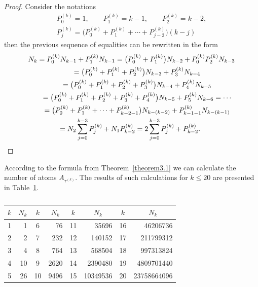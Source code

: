 \documentclass[pdftex]{sigma}
\numberwithin{equation}{section}
\begin{document}
\begin{proof}
Consider the notations
\begin{gather*}
P_{0}^{(k)}=1, \qquad P_{1}^{(k)}=k-1, \qquad P_{2}^{(k)}=k-2,\\
P_{j}^{(k)}=\big(P_{0}^{(k)}+P_{1}^{(k)}+\cdots+P_{j-2}^{(k)}\big)(k-j)
\end{gather*} then the previous sequence of equalities can be rewritten in the form
\begin{gather*}
N_{k}= P_{0}^{(k)} N_{k-1}+P_{1}^{(k)} N_{k-1} = \big(P_{0}^{(k)}+P_{1}^{(k)}\big) N_{k-2}+P_{0}^{(k)}P_{2}^{(k)} N_{k-3}\\
\hphantom{N_{k}}{} = \big(P_{0}^{(k)}+P_{1}^{(k)}+P_{2}^{(k)}\big) N_{k-3}+P_{3}^{(k)} N_{k-4}\\
\hphantom{N_{k}}{} = \big(P_{0}^{(k)}+P_{1}^{(k)}+P_{2}^{(k)}+P_{3}^{(k)}\big) N_{k-4}+P_{4}^{(k)} N_{k-5}\\
\hphantom{N_{k}}{} = \big(P_{0}^{(k)}+P_{1}^{(k)}+P_{2}^{(k)}+P_{3}^{(k)}+P_{4}^{(k)}\big) N_{k-5}+P_{5}^{(k)} N_{k-6}= \cdots\\
\hphantom{N_{k}}{} = \big(P_{0}^{(k)}+P_{1}^{(k)}+\cdots+P_{k-2-1}^{(k)}\big) N_{k-(k-2)}+P_{k-1-1}^{(k)} N_{k-(k-1)}\\
\hphantom{N_{k}}{} = N_{2} \sum_{j=0}^{k-3}P_{j}^{(k)}+N_{1} P_{k-2}^{(k)}= 2 \sum_{j=0}^{k-3}P_{j}^{(k)}+P_{k-2}^{(k)}.\tag*{\qed}
\end{gather*}\renewcommand{\qed}{}
\end{proof}

According to the formula from Theorem~\ref{theorem3.1} we can calculate the number of atoms $A_{\tau^{(k)}}$. The results of such calculations for $k\leq20$ are presented in Table~\ref{table1}.
\begin{table}[h!]\centering
\caption{}\label{table1}\vspace{1mm}

\begin{tabular}{|c|r|c|r|c|r|c|r|}
\hline
$k$ & \multicolumn{1}{|c|}{$N_{k}$} & $k$ & \multicolumn{1}{|c|}{$N_{k}$} & $k$ & \multicolumn{1}{|c|}{$N_{k}$} & $k$ & \multicolumn{1}{|c|}{$N_{k}$} \\
\hline
1 & 1 & \hphantom{1}6 & 76 & 11 & 35696 & 16 & 46206736\\
2 & 2 & \hphantom{1}7 & 232 & 12 & 140152 & 17 & 211799312\\
3 & 4 & \hphantom{1}8 & 764 & 13 & 568504 & 18 & 997313824\\
4 & 10 & \hphantom{1}9 & 2620 & 14 & 2390480 & 19 & 4809701440\\
5 & 26 & 10 & 9496 & 15 & 10349536 & 20 & 23758664096\\
\hline
\end{tabular}
\end{table}
\end{document}
